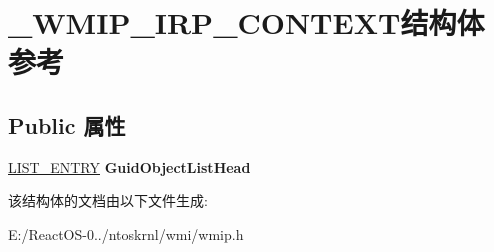 \hypertarget{struct___w_m_i_p___i_r_p___c_o_n_t_e_x_t}{}\section{\+\_\+\+W\+M\+I\+P\+\_\+\+I\+R\+P\+\_\+\+C\+O\+N\+T\+E\+X\+T结构体 参考}
\label{struct___w_m_i_p___i_r_p___c_o_n_t_e_x_t}
\subsection*{Public 属性}
\begin{DoxyCompactItemize}
\item 
\mbox{\label{struct___w_m_i_p___i_r_p___c_o_n_t_e_x_t_a94b64dd6fb989ff61856ef4d6f52b714}} 
\hyperlink{struct___l_i_s_t___e_n_t_r_y}{L\+I\+S\+T\+\_\+\+E\+N\+T\+RY} {\bfseries Guid\+Object\+List\+Head}
\end{DoxyCompactItemize}


该结构体的文档由以下文件生成\+:\begin{DoxyCompactItemize}
\item 
E\+:/\+React\+O\+S-\/0../ntoskrnl/wmi/wmip.\+h\end{DoxyCompactItemize}
